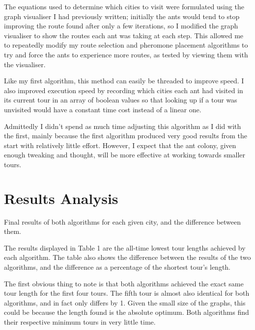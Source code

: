 \documentclass[a4paper,11pt]{article}
\begin{document}
The equations used to determine which cities to visit were formulated using the
graph visualiser I had previously written; initially the ants would tend to
stop improving the route found after only a few iterations, so I modified the
graph visualiser to show the routes each ant was taking at each step. This
allowed me to repeatedly modify my route selection and pheromone placement
algorithms to try and force the ants to experience more routes, as tested by 
viewing them with the visualiser.

Like my first algorithm, this method can easily be threaded to improve speed.
I also improved execution speed by recording which cities each ant had visited
in its current tour in an array of boolean values so that looking up if a tour
was unvisited would have a constant time cost instead of a linear one.

Admittedly I didn't spend as much time adjusting this algorithm as I did with
the first, mainly because the first algorithm produced very good results from
the start with relatively little effort. However, I expect that the ant colony,
given enough tweaking and thought, will be more effective at working towards
smaller tours.

\section{Results Analysis}
\begin{table}
\begin{center}

\caption{Final results of both algorithms for each given city, and the
	difference between them.}
\end{center}
\end{table}

The results displayed in Table 1 are the all-time lowest tour lengths
achieved by each algorithm. The table also shows the difference between the
results of the two algorithms, and the difference as a percentage of the
shortest tour's length.

The first obvious thing to note is that both algorithms achieved the exact same
tour length for the first four tours. The fifth tour is almost also identical
for both algorithms, and in fact only differs by 1. Given the small size of the
graphs, this could be because the length found is the absolute optimum. Both 
algorithms find their respective minimum tours in very little time.
\end{document}
